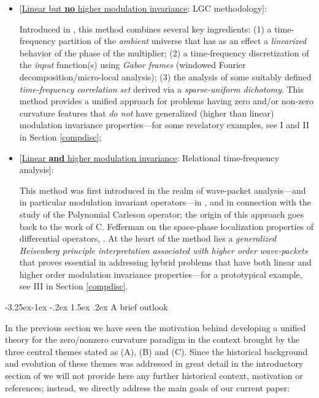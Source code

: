\documentclass[a4paper,reqno]{amsart}
\makeatletter
\def\subsection{\@startsection{subsection}{2}{\z@}%
	{-3.25ex\@plus -1ex \@minus -.2ex}%
	{1.5ex \@plus .2ex}%
	{\normalfont\bfseries\boldmath}}
\numberwithin{equation}{section}
\theoremstyle{definition}
\makeatother
\begin{document}
\begin{itemize}
	\item \textsf{[\underline{Linear but \textbf{no} higher modulation invariance}: LGC methodology]}:

Introduced in \cite{Lie19}, this method combines several key ingredients: (1) a time-frequency partition of the \emph{ambient} universe that has as an effect a \emph{linearized} behavior of the phase of the multiplier; (2) a time-frequency discretization of the \emph{input} function(s) using \emph{Gabor frames} (windowed Fourier decomposition/micro-local analysis); (3) the analysis of some suitably defined \emph{time-frequency correlation set} derived via a \emph{sparse-uniform dichotomy}. This method provides a unified approach for problems having zero and/or non-zero curvature features that \emph{do not} have generalized (higher than linear) modulation invariance properties---for some revelatory examples, see I and II in Section \ref{compdisc};
	
	
	\item \textsf{[\underline{Linear \textbf{and} higher modulation invariance}: Relational time-frequency analysis]}:

This method was first introduced in the realm of wave-packet analysis---and in particular modulation invariant operators---in \cite{Lie09}, \cite{Lie09Thesis} and \cite{Lie20} in connection with the study of the Polynomial Carleson operator; the origin of this approach goes back to the work of C. Fefferman on the space-phase localization properties of differential operators, \cite{Fefunc}. At the heart of the method lies a \emph{generalized Heisenberg principle interpretation associated with higher order wave-packets} that proves essential in addressing hybrid problems that have both linear and higher order modulation invariance properties---for a prototypical example, see III in Section \ref{compdisc}.
\end{itemize}

\subsection{A brief outlook}

In the previous section we have seen the motivation behind developing a unified theory for the zero/nonzero curvature paradigm in the context brought by the three central themes stated as (A), (B) and (C). Since the historical background and evolution of these themes was addressed in great detail in the introductory section of  \cite{Lie19} we will not provide here any further historical context, motivation or references; instead, we directly address the main goals of our current paper:
\end{document}
